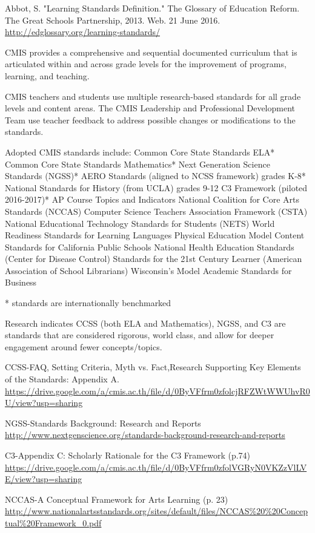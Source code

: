 \documentclass{report}
\begin{document}
\begin{evidence}
\item Abbot, S. "Learning Standards Definition." The Glossary of Education Reform. The Great Schools Partnership, 2013. Web. 21 June 2016. \url{http://edglossary.org/learning-standards/}
\end{evidence}

\begin{findings}
CMIS provides a comprehensive and sequential documented curriculum that is articulated within and across grade levels for the improvement of programs, learning, and teaching.

CMIS teachers and students use multiple research-based standards for all grade levels and content areas. The CMIS Leadership and Professional Development Team use teacher feedback to address possible changes or modifications to the standards. 

Adopted CMIS standards include:
Common Core State Standards ELA*
Common Core State Standards Mathematics*
Next Generation Science Standards (NGSS)*
AERO Standards (aligned to NCSS framework) grades K-8*
National Standards for History (from UCLA) grades 9-12
C3 Framework (piloted 2016-2017)*
AP Course Topics and Indicators
National Coalition for Core Arts Standards  (NCCAS)
Computer Science Teachers Association Framework (CSTA)
National Educational Technology Standards for Students (NETS)
World Readiness Standards for Learning Languages
Physical Education Model Content Standards for California Public Schools 
National Health Education Standards (Center for Disease Control)
Standards for the 21st Century Learner (American Association of School Librarians)
Wisconsin’s Model Academic Standards for Business  

* standards are internationally benchmarked 

Research indicates CCSS (both ELA and Mathematics), NGSS, and C3 are standards that are considered rigorous, world class, and allow for deeper engagement around fewer concepts/topics.
\end{findings}

\begin{evidence}
\item CCSS-FAQ, Setting Criteria, Myth vs. Fact,Research Supporting Key Elements of the Standards: Appendix A. \url{https://drive.google.com/a/cmis.ac.th/file/d/0ByVFfrm0zfolcjRFZWtWWUhvR0U/view?usp=sharing}
\item NGSS-Standards Background:  Research and Reports \url{http://www.nextgenscience.org/standards-background-research-and-reports}
\item C3-Appendix C: Scholarly Rationale for the C3 Framework (p.74) \url{https://drive.google.com/a/cmis.ac.th/file/d/0ByVFfrm0zfolVGRyN0VKZzVlLVE/view?usp=sharing}
\item NCCAS-A Conceptual Framework for Arts Learning (p. 23) \url{http://www.nationalartsstandards.org/sites/default/files/NCCAS\%20\%20Conceptual\%20Framework_0.pdf}
\end{evidence}
\end{document}
